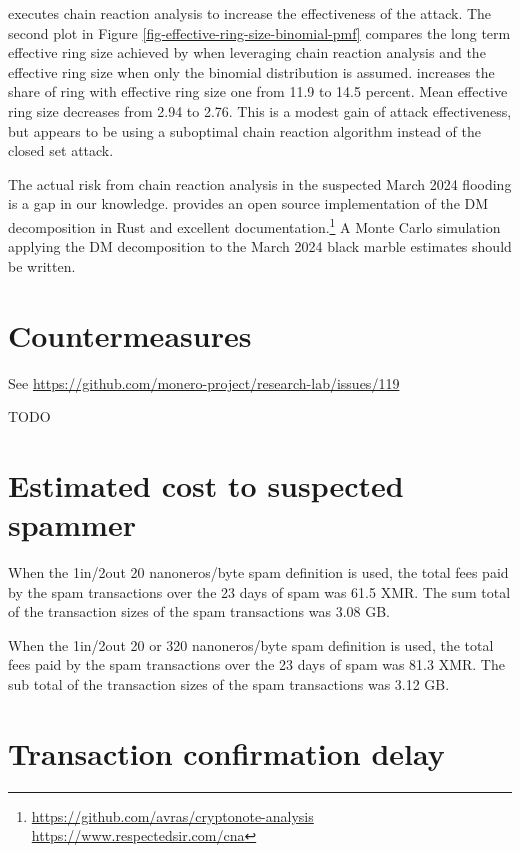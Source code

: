 \documentclass[usletter,11pt,english,openany]{article}
\begin{document}
\cite{Chervinski2021} executes chain reaction analysis to increase
the effectiveness of the attack. The second plot in Figure \ref{fig-effective-ring-size-binomial-pmf}
compares the long term effective ring size achieved by \cite{Chervinski2021}
when leveraging chain reaction analysis and the effective ring size
when only the binomial distribution is assumed. \cite{Chervinski2021}
increases the share of ring with effective ring size one from 11.9
to 14.5 percent. Mean effective ring size decreases from 2.94 to 2.76.
This is a modest gain of attack effectiveness, but \cite{Chervinski2021}
appears to be using a suboptimal chain reaction algorithm instead
of the closed set attack.

The actual risk from chain reaction analysis in the suspected March
2024 flooding is a gap in our knowledge. \cite{Vijayakumaran2023}
provides an open source implementation of the DM decomposition in
Rust and excellent documentation.\footnote{\url{https://github.com/avras/cryptonote-analysis}\\
\url{https://www.respectedsir.com/cna}} A Monte Carlo simulation applying the DM decomposition to the March
2024 black marble estimates should be written.

\section{Countermeasures}

See \url{https://github.com/monero-project/research-lab/issues/119}

TODO

\section{Estimated cost to suspected spammer}

When the 1in/2out 20 nanoneros/byte spam definition is used, the total
fees paid by the spam transactions over the 23 days of spam was 61.5
XMR. The sum total of the transaction sizes of the spam transactions
was 3.08 GB.

When the 1in/2out 20 or 320 nanoneros/byte spam definition is used,
the total fees paid by the spam transactions over the 23 days of spam
was 81.3 XMR. The sub total of the transaction sizes of the spam transactions
was 3.12 GB.

\section{Transaction confirmation delay}
\end{document}
